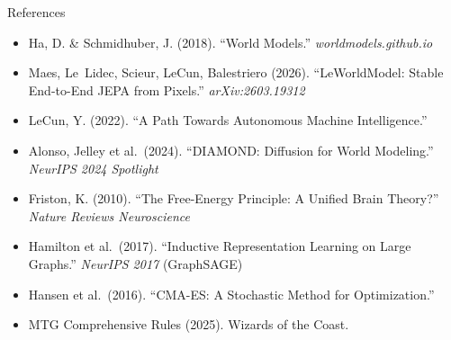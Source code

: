 \documentclass[aspectratio=169, 10pt]{beamer}
\begin{document}
\begin{frame}{References}
  \footnotesize
  \begin{itemize}
    \item Ha, D. \& Schmidhuber, J. (2018). ``World Models.'' \textit{worldmodels.github.io}
    \item Maes, Le~Lidec, Scieur, LeCun, Balestriero (2026).
          ``LeWorldModel: Stable End-to-End JEPA from Pixels.'' \textit{arXiv:2603.19312}
    \item LeCun, Y. (2022). ``A Path Towards Autonomous Machine Intelligence.''
    \item Alonso, Jelley et al.\ (2024). ``DIAMOND: Diffusion for World Modeling.''
          \textit{NeurIPS 2024 Spotlight}
    \item Friston, K. (2010). ``The Free-Energy Principle: A Unified Brain Theory?''
          \textit{Nature Reviews Neuroscience}
    \item Hamilton et al.\ (2017). ``Inductive Representation Learning on Large Graphs.''
          \textit{NeurIPS 2017} (GraphSAGE)
    \item Hansen et al.\ (2016). ``CMA-ES: A Stochastic Method for Optimization.''
    \item MTG Comprehensive Rules (2025). Wizards of the Coast.
  \end{itemize}
\end{frame}
\end{document}

